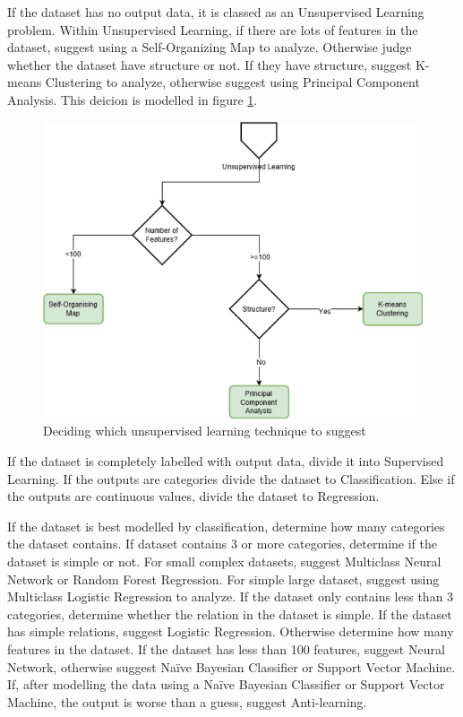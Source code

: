 \documentclass[titlepage]{article}
\begin{document}
If the dataset has no output data, it is classed as an Unsupervised Learning problem. Within Unsupervised Learning, if there are lots of features in the dataset, suggest using a Self-Organizing Map to analyze. Otherwise judge whether the dataset have structure or not. If they have structure, suggest K-means Clustering to analyze, otherwise suggest using Principal Component Analysis. This deicion is modelled in figure \ref{unsupervised-decision}.

\begin{figure}[h!]
  \centering
  \includegraphics[width=\textwidth]{unsupervised-decision}
  \caption{Deciding which unsupervised learning technique to suggest}
  \label{unsupervised-decision}
\end{figure}

If the dataset is completely labelled with output data, divide it into Supervised Learning. If the outputs are categories divide the dataset to Classification. Else if the outputs are continuous values, divide the dataset to Regression.

If the dataset is best modelled by classification, determine how many categories the dataset contains. If dataset contains 3 or more categories, determine if the dataset is simple or not. For small complex datasets, suggest Multiclass Neural Network or Random Forest Regression. For simple large dataset, suggest using Multiclass Logistic Regression to analyze. If the dataset only contains less than 3 categories, determine whether the relation in the dataset is simple. If the dataset has simple relations, suggest Logistic Regression. Otherwise determine how many features in the dataset. If the dataset has less than 100 features, suggest Neural Network, otherwise suggest Naïve Bayesian Classifier or Support Vector Machine. If, after modelling the data using a Naïve Bayesian Classifier or Support Vector Machine, the output is worse than a guess, suggest Anti-learning.
\end{document}
